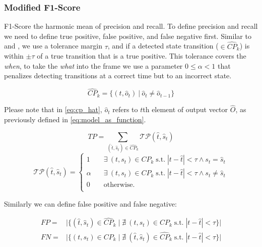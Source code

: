\subsubsection{Modified F1-Score}
F1-Score the harmonic mean of precision and recall. 
To define precision and recall we need to define true positive, false positive, and false negative first.
Similar to \cite{Lee2018TimeSeriesSegmentation} and \cite{Truong2018ChangePointSurvey}, we use a tolerance margin $\tau$, and if a detected state transition ($\in \hat{CP}_k$) is within $\pm\tau$ of a true transition that is a true positive. 
This tolerance covers the \textit{when}, to take the \textit{what} into the frame we use a parameter $0 \leq \alpha < 1$ that penalizes detecting transitions at a correct time but to an incorrect state.

\begin{equation} \label{eq:cp_hat}
\hat{CP}_k = \big\{(t, \hat{o}_t)\: |\: \hat{o}_t \neq \hat{o}_{t-1} \big\}
\end{equation}

Please note that in \eqref{eq:cp_hat}, $\hat{o}_t$ refers to $t$th element of output vector $\hat{O}$, as previously defined in \eqref{eq:model_as_function}.

\begin{equation}
TP =\sum_{(\hat{t}, \hat{s}_t) \in \hat{CP}_k} \mathcal{TP}(\hat{t}, \hat{s}_t)
\end{equation}
\begin{equation*}
\mathcal{TP}(\hat{t}, \hat{s}_t) =
     \begin{cases}
       1      &\quad \exists\: (t, s_t) \in CP_k \;\text{s.t.}\; |t - \hat{t}| < \tau \land s_t = \hat{s}_t \\
       \alpha &\quad \exists\: (t, s_t) \in CP_k \;\text{s.t.}\; |t - \hat{t}| < \tau \land s_t \neq \hat{s}_t  \\
       0     &\quad\text{otherwise.} \\ 
     \end{cases}
\end{equation*}

Similarly we can define false positive and false negative:

\begin{equation} \label{eq:false_negative}
\begin{split}
FP ={}&{}\Big|\big\{ (\hat{t}, \hat{s}_t) \in \hat{CP}_k \;\big|\; \nexists\: (t, s_t) \in CP_k \;\text{s.t.}\; |t - \hat{t}| < \tau\big\}\Big| \\
FN ={}&{}\Big|\big\{ (t, s_t) \in CP_k \;\big|\; \nexists\: (\hat{t}, \hat{s}_t) \in \hat{CP}_k \;\text{s.t.}\; |t - \hat{t}| < \tau\big\}\Big| 
\end{split}
\end{equation}

